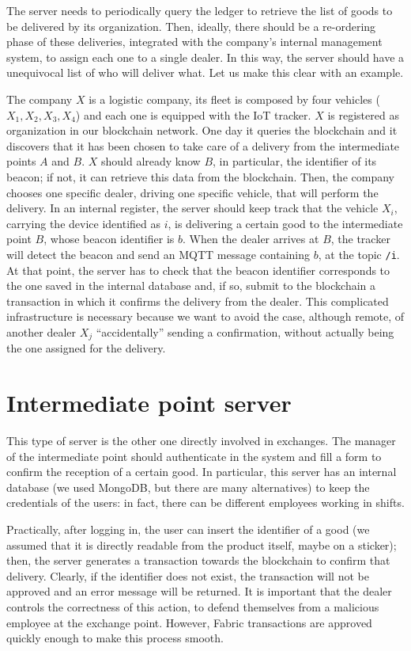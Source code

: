 The server needs to periodically query the ledger to retrieve the list of goods to be delivered by its organization. Then, ideally, there should be a re-ordering phase of these deliveries, integrated with the company's internal management system, to assign each one to a single dealer. In this way, the server should have a unequivocal list of who will deliver what. Let us make this clear with an example.

The company $X$ is a logistic company, its fleet is composed by four vehicles ($X_1, X_2, X_3, X_4$) and each one is equipped with the IoT tracker. $X$ is registered as organization in our blockchain network. One day it queries the blockchain and it discovers that it has been chosen to take care of a delivery from the intermediate points $A$ and $B$. $X$ should already know $B$, in particular, the identifier of its beacon; if not, it can retrieve this data from the blockchain. Then, the company chooses one specific dealer, driving one specific vehicle, that will perform the delivery. In an internal register, the server should keep track that the vehicle $X_i$, carrying the device identified as $i$, is delivering a certain good to the intermediate point $B$, whose beacon identifier is $b$. When the dealer arrives at $B$, the tracker will detect the beacon and send an MQTT message containing $b$, at the topic \texttt{/i}. At that point, the server has to check that the beacon identifier corresponds to the one saved in the internal database and, if so, submit to the blockchain a transaction in which it confirms the delivery from the dealer. This complicated infrastructure is necessary because we want to avoid the case, although remote, of another dealer $X_j$ ``accidentally'' sending a confirmation, without actually being the one assigned for the delivery.

\section{Intermediate point server}
This type of server is the other one directly involved in exchanges. The manager of the intermediate point should authenticate in the system and fill a form to confirm the reception of a certain good. In particular, this server has an internal database (we used MongoDB, but there are many alternatives) to keep the credentials of the users: in fact, there can be different employees working in shifts. 

Practically, after logging in, the user can insert the identifier of a good (we assumed that it is directly readable from the product itself, maybe on a sticker); then, the server generates a transaction towards the blockchain to confirm that delivery. Clearly, if the identifier does not exist, the transaction will not be approved and an error message will be returned. It is important that the dealer controls the correctness of this action, to defend themselves from a malicious employee at the exchange point. However, Fabric transactions are approved quickly enough to make this process smooth.

